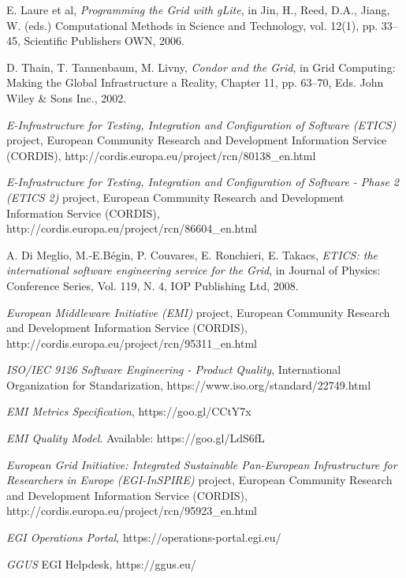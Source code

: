 \documentclass[journal]{IEEEtran}
\begin{document}
\begin{thebibliography}{1}
E. Laure et al, \emph{Programming the Grid with gLite}, in Jin, H., Reed, D.A.,
Jiang, W. (eds.) Computational Methods in Science and Technology, vol. 12(1),
pp. 33–45, Scientific Publishers OWN, 2006.

D. Thain, T. Tannenbaum, M. Livny, \emph{Condor and the Grid}, in Grid
Computing: Making the Global Infrastructure a Reality, Chapter 11, pp. 63–70,
Eds. John Wiley \& Sons Inc., 2002.

\emph{E-Infrastructure for Testing, Integration and Configuration of Software
(ETICS)} project, European Community Research and Development Information
Service (CORDIS), http://cordis.europa.eu/project/rcn/80138\_en.html

\emph{E-Infrastructure for Testing, Integration and Configuration of Software -
Phase 2 (ETICS 2)} project, European Community Research and Development
Information Service (CORDIS),
http://cordis.europa.eu/project/rcn/86604\_en.html

A. Di Meglio, M.-E.Bégin, P. Couvares, E. Ronchieri, E. Takacs, \emph{ETICS:
the international software engineering service for the Grid}, in Journal of
Physics: Conference Series, Vol. 119, N. 4, IOP Publishing Ltd, 2008.

\emph{European Middleware Initiative (EMI)} project, European Community
Research and Development Information Service (CORDIS),
http://cordis.europa.eu/project/rcn/95311\_en.html

\emph{ISO/IEC 9126 Software Engineering - Product Quality}, International
Organization for Standarization, https://www.iso.org/standard/22749.html

\emph{EMI Metrics Specification}, https://goo.gl/CCtY7x


\emph{EMI Quality Model}. Available: https://goo.gl/LdS6fL

\emph{European Grid Initiative: Integrated Sustainable Pan-European
Infrastructure for Researchers in Europe (EGI-InSPIRE)} project, European
Community Research and Development Information Service (CORDIS),
http://cordis.europa.eu/project/rcn/95923\_en.html

\emph{EGI Operations Portal},
https://operations-portal.egi.eu/

\emph{GGUS} EGI Helpdesk,
https://ggus.eu/


\end{thebibliography}
\end{document}
